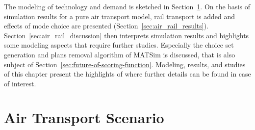 The modeling of technology and demand is sketched in Section~\ref{sec:air_rail_scenario}. 
On the basis of simulation results for a pure air transport model, rail transport is added and effects of mode choice are presented (Section~\ref{sec:air_rail_results}). 
Section~\ref{sec:air_rail_discussion} then interprets simulation results and highlights some modeling aspects that require further studies. 
Especially the choice set generation and plans removal algorithm of MATSim is discussed, that is also subject of Section~\ref{sec:future-of-scoring-function}. 
Modeling, results, and studies of this chapter present the highlights of \citet[][Chapter~6, pp.~119]{Grether2014PhD} where further details can be found in case of interest.   

\section{Air Transport Scenario}
\label{sec:air_rail_scenario}
